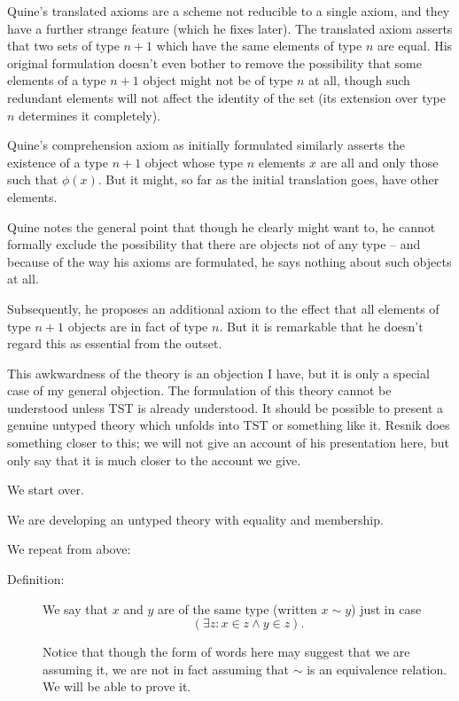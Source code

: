 \documentclass{slides}
\begin{document}
\begin{slide}

Quine's translated axioms are a scheme not reducible to a single axiom, and they have a further strange feature (which he fixes later).  The translated axiom asserts that two sets of type $n+1$ which have the same elements of type $n$ are equal.  His original formulation doesn't even bother to remove the possibility that
some elements of a type $n+1$ object might not be of type $n$ at all, though such redundant elements will not affect the identity of the set (its extension over type $n$ determines it completely).

Quine's comprehension axiom as initially formulated similarly asserts the existence of a type $n+1$ object whose type $n$ elements $x$ are all and only those such that $\phi(x)$.  But it might, so far as the initial translation goes, have other elements.

\end{slide}

\begin{slide}

Quine notes the general point that though he clearly might want to, he cannot formally exclude the possibility that there are objects not of any type -- and because of the way his axioms are formulated, he says nothing about such objects at all.

Subsequently, he proposes an additional axiom to the effect that all elements of type $n+1$ objects are in fact of type $n$.  But it is remarkable that he doesn't regard this as essential from the outset.

This awkwardness of the theory is an objection I have, but it is only a special case of my general objection.  The formulation of this theory cannot be understood unless TST is already understood.  It should be possible to present
a genuine untyped theory which unfolds into TST or something like it.  Resnik does something closer to this;  we will not give an account of his presentation here, but only say that it is much closer to the account we give.


\end{slide}

\begin{slide}

{\Large We start over.}

We are developing an untyped theory with equality and membership.

We repeat from above:

\begin{description}

\item[Definition:]   We say that $x$ and $y$ are of the same type (written $x \sim y$) just in case $$(\exists z:x \in z \wedge y \in z).$$

Notice that though the form of words here may suggest that we are assuming it, we are not in fact assuming that $\sim$ is an equivalence relation.  We will be able to prove it.

\end{description}

\end{slide}
\end{document}
